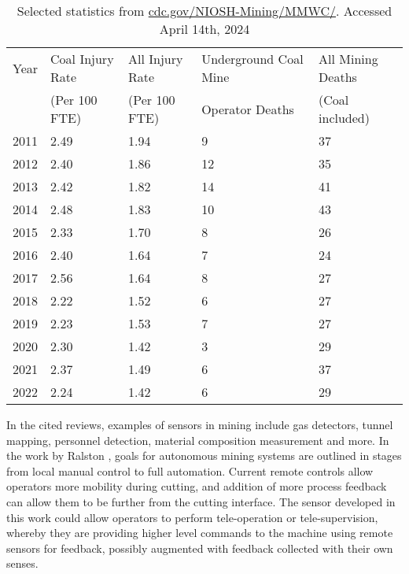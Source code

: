 \begin{table}[]
\centering
\caption{Selected statistics from \url{cdc.gov/NIOSH-Mining/MMWC/}. Accessed April 14th, 2024}
\label{tab:deaths}
\begin{tabular}{|l|l|l|l|l|}
\hline
Year & Coal Injury Rate & All Injury Rate & Underground Coal Mine & All Mining Deaths \\
     & (Per 100 FTE)    & (Per 100 FTE)   & Operator Deaths       & (Coal included)   \\ \hline
2011 & 2.49             & 1.94            & 9                     & 37                \\ \hline
2012 & 2.40             & 1.86            & 12                    & 35                \\ \hline
2013 & 2.42             & 1.82            & 14                    & 41                \\ \hline
2014 & 2.48             & 1.83            & 10                    & 43                \\ \hline
2015 & 2.33             & 1.70            & 8                     & 26                \\ \hline
2016 & 2.40             & 1.64            & 7                     & 24                \\ \hline
2017 & 2.56             & 1.64            & 8                     & 27                \\ \hline
2018 & 2.22             & 1.52            & 6                     & 27                \\ \hline
2019 & 2.23             & 1.53            & 7                     & 27                \\ \hline
2020 & 2.30             & 1.42            & 3                     & 29                \\ \hline
2021 & 2.37             & 1.49            & 6                     & 37                \\ \hline
2022 & 2.24             & 1.42            & 6                     & 29                \\ \hline
\end{tabular}
\end{table}

In the cited reviews, examples of sensors in mining include
gas detectors, tunnel mapping, personnel detection, material composition measurement and more.
In the work by Ralston \cite{RALSTON2014305}, goals for autonomous mining systems are outlined in stages
from local manual control to full automation.
Current remote controls allow operators more mobility during cutting, and addition of 
more process feedback can allow them to be further from the cutting interface.
The sensor developed in this work could allow operators to perform tele-operation or tele-supervision,
whereby they are providing higher level commands to the machine using remote sensors for feedback, 
possibly augmented with feedback collected with their own senses.

